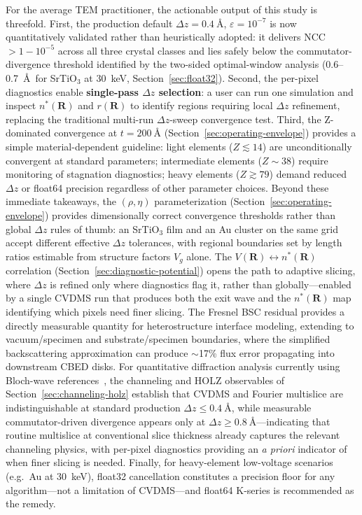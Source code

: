 \documentclass[twoside,11pt]{article}
\begin{document}
For the average TEM practitioner, the actionable output of this study is threefold. First, the production default $\Delta z=\SI{0.4}{\angstrom}$, $\varepsilon=10^{-7}$ is now quantitatively validated rather than heuristically adopted: it delivers NCC $>1-10^{-5}$ across all three crystal classes and lies safely below the commutator-divergence threshold identified by the two-sided optimal-window analysis (0.6--0.7~\AA\ for SrTiO$_3$ at \SI{30}{\keV}, Section~\ref{sec:float32}). Second, the per-pixel diagnostics enable \textbf{single-pass $\Delta z$ selection}: a user can run one simulation and inspect $n^*(\mathbf{R})$ and $r(\mathbf{R})$ to identify regions requiring local $\Delta z$ refinement, replacing the traditional multi-run $\Delta z$-sweep convergence test. Third, the Z-dominated convergence at $t=\SI{200}{\angstrom}$ (Section~\ref{sec:operating-envelope}) provides a simple material-dependent guideline: light elements ($Z\lesssim14$) are unconditionally convergent at standard parameters; intermediate elements ($Z\sim38$) require monitoring of stagnation diagnostics; heavy elements ($Z\gtrsim79$) demand reduced $\Delta z$ or float64 precision regardless of other parameter choices. Beyond these immediate takeaways, the $(\rho,\eta)$ parameterization (Section~\ref{sec:operating-envelope}) provides dimensionally correct convergence thresholds rather than global $\Delta z$ rules of thumb: an SrTiO$_3$ film and an Au cluster on the same grid accept different effective $\Delta z$ tolerances, with regional boundaries set by length ratios estimable from structure factors $V_g$ alone. The $V(\mathbf{R})\leftrightarrow n^*(\mathbf{R})$ correlation (Section~\ref{sec:diagnostic-potential}) opens the path to adaptive slicing, where $\Delta z$ is refined only where diagnostics flag it, rather than globally---enabled by a single CVDMS run that produces both the exit wave and the $n^*(\mathbf{R})$ map identifying which pixels need finer slicing. The Fresnel BSC residual provides a directly measurable quantity for heterostructure interface modeling, extending to vacuum/specimen and substrate/specimen boundaries, where the simplified backscattering approximation can produce $\sim$17\% flux error propagating into downstream CBED disks. For quantitative diffraction analysis currently using Bloch-wave references~\cite{Kirkland2020,PennycookNellist2011,Allen2003}, the channeling and HOLZ observables of Section~\ref{sec:channeling-holz} establish that CVDMS and Fourier multislice are indistinguishable at standard production $\Delta z\le\SI{0.4}{\angstrom}$, while measurable commutator-driven divergence appears only at $\Delta z\ge\SI{0.8}{\angstrom}$---indicating that routine multislice at conventional slice thickness already captures the relevant channeling physics, with per-pixel diagnostics providing an \textit{a priori} indicator of when finer slicing is needed. Finally, for heavy-element low-voltage scenarios (e.g.\ Au at \SI{30}{\keV}), float32 cancellation constitutes a precision floor for any algorithm---not a limitation of CVDMS---and float64 K-series is recommended as the remedy.
\end{document}
